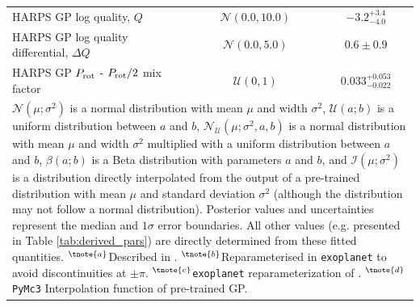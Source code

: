 \documentclass[fleqn,usenatbib]{mnras}
\newcommand{\harps}{{HARPS}}
\begin{document}
\begin{table}
\begin{center}
\begin{tabular}{lcc}
\harps{} GP log quality, $Q$ &  $\mathcal{N}(0.0,10.0)$  &   $ -3.2^{+3.4}_{-4.0} $ \\
\harps{} GP log quality differential, $\Delta Q$ &  $\mathcal{N}(0.0,5.0)$  &   $ 0.6 \pm 0.9 $ \\
\harps{} GP $P_{\rm rot}$ - $P_{\rm rot}/2$ mix factor &  $\mathcal{U}(0,1)$  &   $ 0.033^{+0.053}_{-0.022} $ \\
\hline
\hline
\multicolumn{3}{l}{%
  \begin{minipage}{14cm}%
    $\mathcal{N}(\mu;\sigma^{2})$ is a normal distribution with mean $\mu$ and width $\sigma^{2}$, $\mathcal{U}(a;b)$ is a uniform distribution between $a$ and $b$, $\mathcal{N}_{\mathcal{U}}(\mu;\sigma^{2},a,b)$ is a normal distribution with mean $\mu$ and width $\sigma^{2}$ multiplied with a uniform distribution between $a$ and $b$, $\beta(a;b)$ is a Beta distribution with parameters $a$ and $b$, and $\mathcal{I}(\mu;\sigma^2)$ is a distribution directly interpolated from the output of a pre-trained distribution with mean $\mu$ and standard deviation $\sigma^2$ (although the distribution may not follow a normal distribution).  Posterior values and uncertainties represent the median and $1\sigma$ error boundaries. All other values (e.g. presented in Table \ref{tab:derived_pars}) are directly determined from these fitted quantities. $^{\tnote{a}}$Described in \citet{kipping2013parametrizing}.  $^{\tnote{b}}$Reparameterised in \texttt{exoplanet} to avoid discontinuities at $\pm\pi$. $^{\tnote{c}}$\texttt{exoplanet} reparameterization of \citet{espinoza2018efficient}. $^{\tnote{d}}$\texttt{PyMc3} Interpolation function of pre-trained GP.
  \end{minipage}%
}\\
\end{tabular}
\end{center}
\label{AllPriors}
\end{table}%
\end{document}
